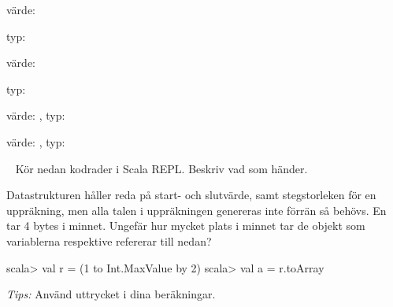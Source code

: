 \SubtaskSolved  värde: 

typ: 

\SubtaskSolved  värde: 

typ: 

\SubtaskSolved  värde: , typ: 

\SubtaskSolved  värde: , typ: 




\QUESTEND









\QUESTBEGIN

\Task \label{task:array} \what~   Kör nedan kodrader i Scala REPL. Beskriv vad som händer.

\Subtask {}

\Subtask {}

\Subtask {}

\Subtask {}

\Subtask {}

\Subtask {}

\Subtask {}

\Subtask {}

\Subtask {}

\Subtask {}

\Subtask {}

\Subtask {}

\Subtask {}

\Subtask {}

\Subtask {}

\Subtask {}

\Subtask {}

\Subtask\Pen Datastrukturen  håller reda på start- och slutvärde, samt stegstorleken för en uppräkning, men alla talen i uppräkningen genereras inte förrän så behövs. En  tar 4 bytes i minnet. Ungefär hur mycket plats i minnet tar de objekt som variablerna  respektive  refererar till nedan?
\begin{REPL}
scala> val r = (1 to Int.MaxValue by 2)
scala> val a = r.toArray
\end{REPL}
\emph{Tips:} Använd uttrycket  i dina beräkningar.

